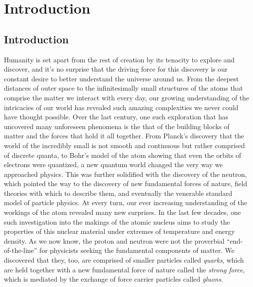 \chapter{Introduction}


\section{Introduction}
Humanity is set apart from the rest of creation by its tenacity to explore and discover, and it's no surprise that the driving force for this discovery is our constant desire to better understand the universe around us. From the deepest distances of outer space to the infinitesimally small structures of the atoms that comprise the matter we interact with every day, our growing understanding of the intricacies of our world has revealed such amazing complexities we never could have thought possible. Over the last century, one such exploration that has uncovered many unforeseen phenomena is the that of the building blocks of matter and the forces that hold it all together. From Planck's discovery that the world of the incredibly small is not smooth and continuous but rather comprised of discrete quanta, to Bohr's model of the atom showing that even the orbits of electrons were quantized, a new quantum world changed the very way we approached physics. This was further solidified with the discovery of the neutron, which pointed the way to the discovery of new fundamental forces of nature, field theories with which to describe them, and eventually the venerable standard model of particle physics. At every turn, our ever increasing understanding of the workings of the atom revealed many new surprises. In the last few decades, one such investigation into the makings of the atomic nucleus aims to study the properties of this nuclear material under extremes of temperature and energy density. As we now know, the proton and neutron were not the proverbial 
``end-of-the-line'' for physicists seeking the fundamental components of matter. We discovered that they, too, are comprised of smaller particles called \textit{quarks}, which are held together with a new fundamental force of nature called the \textit{strong force}, which is mediated by the exchange of force carrier particles called \textit{gluons.} 

